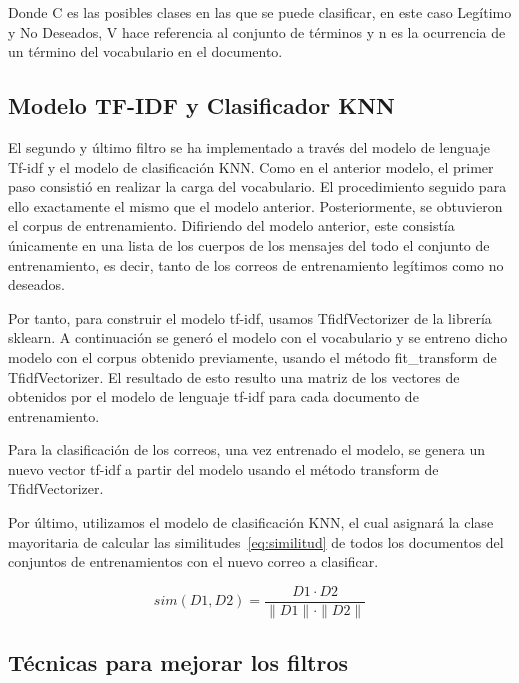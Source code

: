 \documentclass[conference,a4paper]{IEEEtran}
\begin{document}
Donde C es las posibles clases en las que se puede clasificar, en este caso Legítimo y No Deseados, V hace referencia al conjunto de términos y n es la ocurrencia de un término del vocabulario en el documento.



\subsection{Modelo TF-IDF y Clasificador KNN}

El segundo y último filtro se ha implementado a través del modelo de lenguaje Tf-idf y el modelo de clasificación KNN. Como en el anterior modelo, el primer paso consistió en realizar la carga del vocabulario. El procedimiento seguido para ello exactamente el mismo que el modelo anterior. Posteriormente, se obtuvieron el corpus de entrenamiento. Difiriendo del modelo anterior, este consistía únicamente en una lista de los cuerpos de los mensajes del todo el conjunto de entrenamiento, es decir, tanto de los correos de entrenamiento legítimos como no deseados. 

Por tanto, para construir el modelo tf-idf, usamos  TfidfVectorizer de la librería sklearn. A continuación se generó el modelo con el vocabulario y se entreno dicho modelo con el corpus obtenido previamente, usando el método fit\_transform de TfidfVectorizer. El resultado de esto resulto una matriz de los vectores de obtenidos por el modelo de lenguaje tf-idf para cada documento de entrenamiento.

Para la clasificación de los correos, una vez entrenado el modelo, se genera un nuevo vector tf-idf a partir del modelo usando el método transform de TfidfVectorizer.

Por último, utilizamos el modelo de clasificación KNN, el cual asignará la clase mayoritaria de calcular las similitudes~\eqref{eq:similitud} de todos los documentos del conjuntos de entrenamientos con el nuevo correo a clasificar. 


\begin{center}
    \begin{equation}
        \label{eq:similitud}
         sim(D1,D2) = \dfrac{D1 \cdot D2}{{\|D1\| \cdot \|D2\|}} 
    \end{equation}
\end{center}

\subsection{Técnicas para mejorar los filtros }
\end{document}
